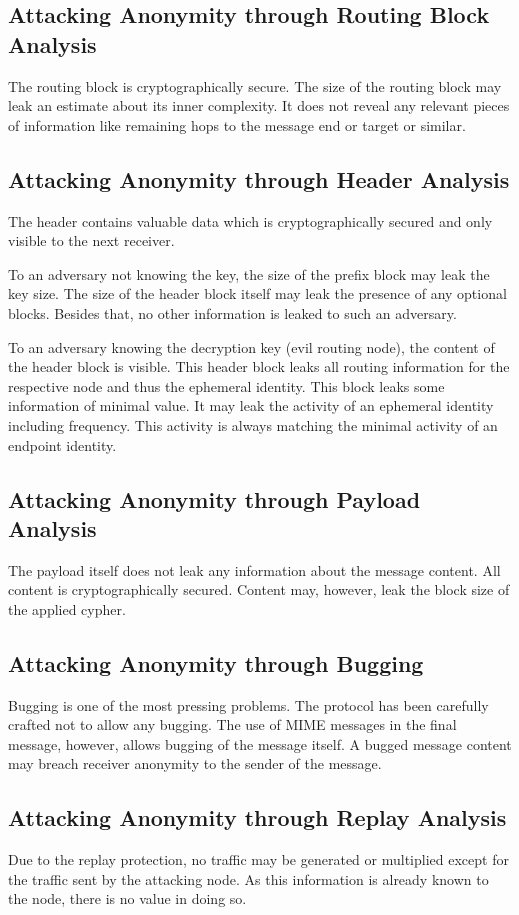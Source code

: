 \subsection{Attacking Anonymity through Routing Block Analysis}
The routing block is cryptographically secure. The size of the routing block may leak an estimate about its inner complexity. It does not reveal any relevant pieces of information like remaining hops to the message end or target or similar.

\subsection{Attacking Anonymity through Header Analysis}
The header contains valuable data which is cryptographically secured and only visible to the next receiver. 

To an adversary not knowing the key, the size of the prefix block may leak the key size. The size of the header block itself may leak the presence of any optional blocks. Besides that, no other information is leaked to such an adversary.

To an adversary knowing the decryption key (evil routing node), the content of the header block is visible. This header block leaks all routing information for the respective node and thus the ephemeral identity. This block leaks some information of minimal value. It may leak the activity of an ephemeral identity including frequency. This activity is always matching the minimal activity of an endpoint identity. 

\subsection{Attacking Anonymity through Payload Analysis}
The payload itself does not leak any information about the message content. All content is cryptographically secured. Content may, however, leak the block size of the applied cypher.

\subsection{Attacking Anonymity through Bugging}
Bugging is one of the most pressing problems. The protocol has been carefully crafted not to allow any bugging. The use of MIME messages in the final message, however, allows bugging of the message itself. A bugged message content may breach receiver anonymity to the sender of the message.

\subsection{Attacking Anonymity through Replay Analysis}
Due to the replay protection, no traffic may be generated or multiplied except for the traffic sent by the attacking node. As this information is already known to the node, there is no value in doing so. 

